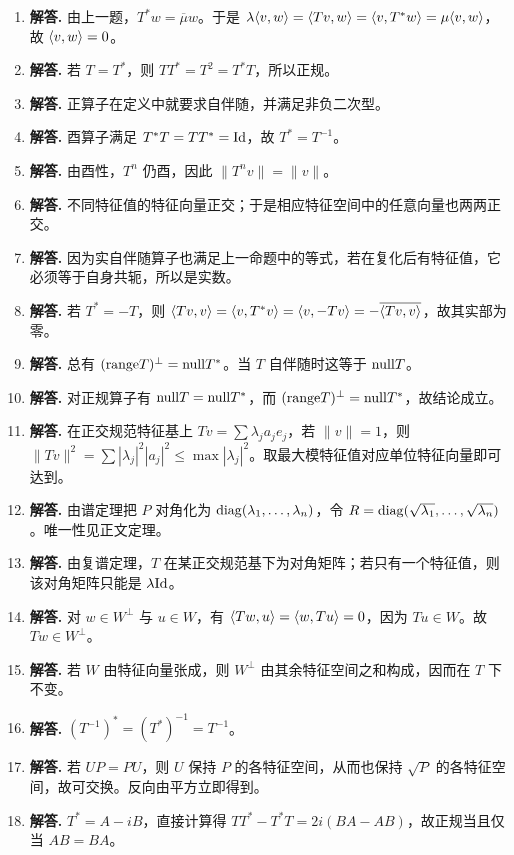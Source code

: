 \begin{enumerate}[label=\textbf{\arabic*.}, leftmargin=*, itemsep=1em]
\item \textbf{解答.} 由上一题，$T^*w=\overline{\mu}w$。于是 $\lambda\langle v, w \rangle=\langle Tv, w \rangle=\langle v, T^*w \rangle=\mu\langle v, w \rangle$，故 $\langle v, w \rangle=0$。
\item \textbf{解答.} 若 $T=T^*$，则 $TT^*=T^2=T^*T$，所以正规。
\item \textbf{解答.} 正算子在定义中就要求自伴随，并满足非负二次型。
\item \textbf{解答.} 酉算子满足 $T^*T=TT^*=\mathrm{Id}$，故 $T^*=T^{-1}$。
\item \textbf{解答.} 由酉性，$T^n$ 仍酉，因此 $\|T^nv\|=\|v\|$。
\item \textbf{解答.} 不同特征值的特征向量正交；于是相应特征空间中的任意向量也两两正交。
\item \textbf{解答.} 因为实自伴随算子也满足上一命题中的等式，若在复化后有特征值，它必须等于自身共轭，所以是实数。
\item \textbf{解答.} 若 $T^*=-T$，则 $\langle Tv, v \rangle=\langle v, T^*v \rangle=\langle v, -Tv \rangle=-\overline{\langle Tv, v \rangle}$，故其实部为零。
\item \textbf{解答.} 总有 $(\mathrm{range} T)^\perp=\mathrm{null} T^*$。当 $T$ 自伴随时这等于 $\mathrm{null} T$。
\item \textbf{解答.} 对正规算子有 $\mathrm{null} T=\mathrm{null} T^*$，而 $(\mathrm{range} T)^\perp=\mathrm{null} T^*$，故结论成立。
\item \textbf{解答.} 在正交规范特征基上 $Tv=\sum \lambda_j a_je_j$，若 $\|v\|=1$，则 $\|Tv\|^2=\sum |\lambda_j|^2|a_j|^2\le \max |\lambda_j|^2$。取最大模特征值对应单位特征向量即可达到。
\item \textbf{解答.} 由谱定理把 $P$ 对角化为 $\mathrm{diag}(\lambda_1,\dots,\lambda_n)$，令 $R=\mathrm{diag}(\sqrt{\lambda_1},\dots,\sqrt{\lambda_n})$。唯一性见正文定理。
\item \textbf{解答.} 由复谱定理，$T$ 在某正交规范基下为对角矩阵；若只有一个特征值，则该对角矩阵只能是 $\lambda\mathrm{Id}$。
\item \textbf{解答.} 对 $w\in W^\perp$ 与 $u\in W$，有 $\langle Tw, u \rangle=\langle w, Tu \rangle=0$，因为 $Tu\in W$。故 $Tw\in W^\perp$。
\item \textbf{解答.} 若 $W$ 由特征向量张成，则 $W^\perp$ 由其余特征空间之和构成，因而在 $T$ 下不变。
\item \textbf{解答.} $(T^{-1})^*=(T^*)^{-1}=T^{-1}$。
\item \textbf{解答.} 若 $UP=PU$，则 $U$ 保持 $P$ 的各特征空间，从而也保持 $\sqrt{P}$ 的各特征空间，故可交换。反向由平方立即得到。
\item \textbf{解答.} $T^*=A-iB$，直接计算得 $TT^*-T^*T=2i(BA-AB)$，故正规当且仅当 $AB=BA$。

\end{enumerate}
